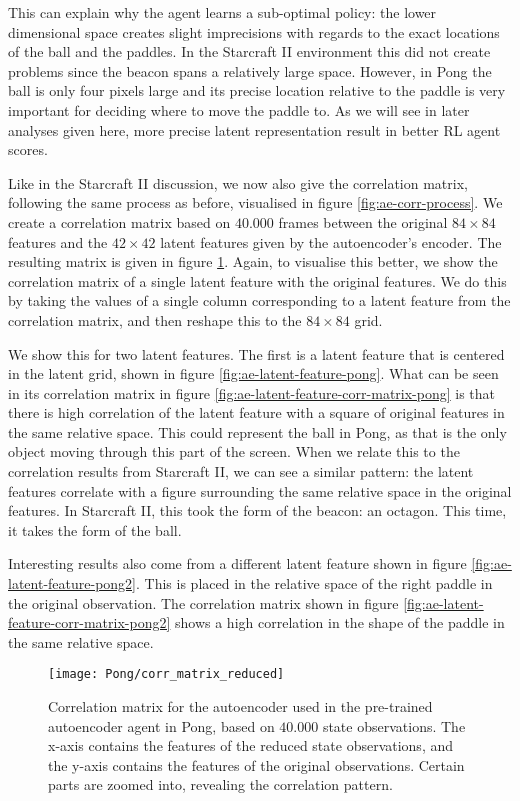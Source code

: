 This can explain why the agent learns a sub-optimal policy: the lower dimensional space creates slight imprecisions with regards to the exact locations of the ball and the paddles. In the Starcraft II environment this did not create problems since the beacon spans a relatively large space. However, in Pong the ball is only four pixels large and its precise location relative to the paddle is very important for deciding where to move the paddle to. As we will see in later analyses given here, more precise latent representation result in better RL agent scores.

Like in the Starcraft II discussion, we now also give the correlation matrix, following the same process as before, visualised in figure \ref{fig:ae-corr-process}. We create a correlation matrix based on $40.000$ frames between the original $84 \times 84$ features and the $42 \times 42$ latent features given by the autoencoder's encoder. The resulting matrix is given in figure \ref{fig:ae-corr-pong}. Again, to visualise this better, we show the correlation matrix of a single latent feature with the original features. We do this by taking the values of a single column corresponding to a latent feature from the correlation matrix, and then reshape this to the $84 \times 84$ grid.

We show this for two latent features. The first is a latent feature that is centered in the latent grid, shown in figure \ref{fig:ae-latent-feature-pong}. What can be seen in its correlation matrix in figure \ref{fig:ae-latent-feature-corr-matrix-pong} is that there is high correlation of the latent feature with a square of original features in the same relative space. This could represent the ball in Pong, as that is the only object moving through this part of the screen. When we relate this to the correlation results from Starcraft II, we can see a similar pattern: the latent features correlate with a figure surrounding the same relative space in the original features. In Starcraft II, this took the form of the beacon: an octagon. This time, it takes the form of the ball.

Interesting results also come from a different latent feature shown in figure \ref{fig:ae-latent-feature-pong2}. This is placed in the relative space of the right paddle in the original observation. The correlation matrix shown in figure \ref{fig:ae-latent-feature-corr-matrix-pong2} shows a high correlation in the shape of the paddle in the same relative space.

\begin{figure}[h]
	\centering
	\texttt{[image: Pong/corr\_matrix\_reduced]}
	\caption{Correlation matrix for the autoencoder used in the pre-trained autoencoder agent in Pong, based on $40.000$ state observations. The x-axis contains the features of the reduced state observations, and the y-axis contains the features of the original observations. Certain parts are zoomed into, revealing the correlation pattern.}
	\label{fig:ae-corr-pong}
\end{figure}

